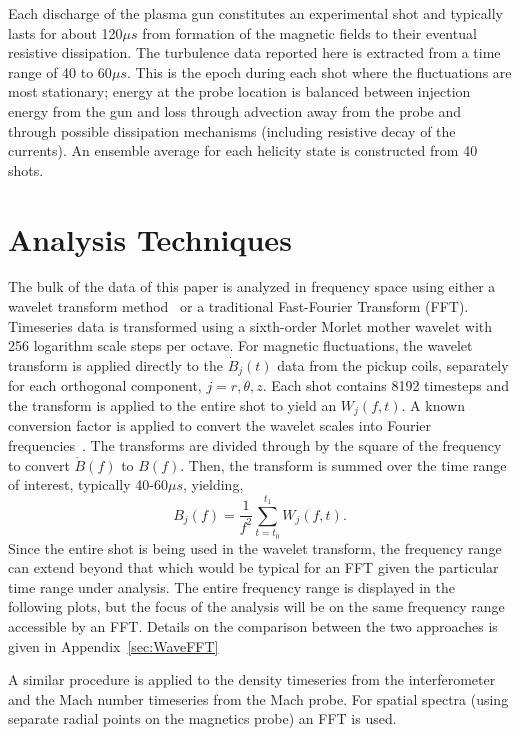 \documentclass[manuscript]{aastex}
\begin{document}
Each discharge of the plasma gun constitutes an experimental shot and typically lasts for about 120$\mu s$ from formation of the magnetic fields to their eventual resistive dissipation. The turbulence data reported here is extracted from a time range of 40 to 60$\mu s$. This is the epoch during each shot where the fluctuations are most stationary; energy at the probe location is balanced between injection energy from the gun and loss through advection away from the probe and through possible dissipation mechanisms (including resistive decay of the currents). An ensemble average for each helicity state is constructed from 40 shots.

\section{Analysis Techniques}\label{sec:analysis}

The bulk of the data of this paper is analyzed in frequency space using either a wavelet transform method~\citep{tor98} or a traditional Fast-Fourier Transform (FFT). Timeseries data is transformed using a sixth-order Morlet mother wavelet with 256 logarithm scale steps per octave. For magnetic fluctuations, the wavelet transform is applied directly to the $\dot{B}_{j}(t)$ data from the pickup coils, separately for each orthogonal component, $j = r,\theta,z$. Each shot contains 8192 timesteps and the transform is applied to the entire shot to yield an $W_{j}(f,t)$. A known conversion factor is applied to convert the wavelet scales into Fourier frequencies~\citep{tor98}. The transforms are divided through by the square of the frequency to convert $\dot{B}(f)$ to $B(f)$. Then, the transform is summed over the time range of interest, typically 40-60$\mu s$, yielding,
\begin{equation}
B_{j}(f) = \frac{1}{f^{2}}\sum_{t=t_{0}}^{t_{1}} W_{j}(f,t).
\label{eq:wavelet_transform}
\end{equation}
%
Since the entire shot is being used in the wavelet transform, the frequency range can extend beyond that which would be typical for an FFT given the particular time range under analysis. The entire frequency range is displayed in the following plots, but the focus of the analysis will be on the same frequency range accessible by an FFT. Details on the comparison between the two approaches is given in Appendix~\ref{sec:WaveFFT}

A similar procedure is applied to the density timeseries from the interferometer and the Mach number timeseries from the Mach probe. For spatial spectra (using separate radial points on the magnetics probe) an FFT is used.
\end{document}
